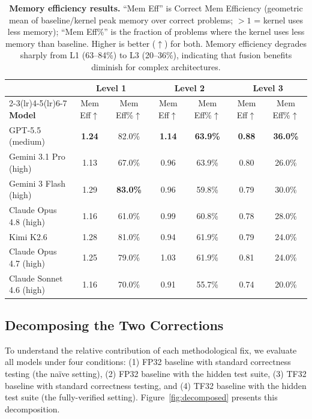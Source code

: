 \documentclass[11pt]{article}
\newcommand{\best}[1]{\textbf{#1}}
\begin{document}
\begin{table}[H]
\centering
\caption{\textbf{Memory efficiency results.} ``Mem Eff'' is Correct Mem Efficiency (geometric mean of baseline/kernel peak memory over correct problems; $>1$ = kernel uses less memory); ``Mem Eff\%'' is the fraction of problems where the kernel uses less memory than baseline. Higher is better ($\uparrow$) for both. Memory efficiency degrades sharply from L1 (63--84\%) to L3 (20--36\%), indicating that fusion benefits diminish for complex architectures.}
\label{tab:memory}\small
\begin{tabular}{l cc cc cc}
\toprule
& \multicolumn{2}{c}{\textbf{Level 1}} & \multicolumn{2}{c}{\textbf{Level 2}} & \multicolumn{2}{c}{\textbf{Level 3}} \\
\cmidrule(lr){2-3}\cmidrule(lr){4-5}\cmidrule(lr){6-7}
\textbf{Model} & Mem Eff$\uparrow$ & Mem Eff\%$\uparrow$ & Mem Eff$\uparrow$ & Mem Eff\%$\uparrow$ & Mem Eff$\uparrow$ & Mem Eff\%$\uparrow$ \\
\midrule
GPT-5.5 (medium)           & \best{1.24} & 82.0\% & \best{1.14} & \best{63.9\%} & \best{0.88} & \best{36.0\%} \\
Gemini 3.1 Pro (high)      & 1.13 & 67.0\% & 0.96 & 63.9\% & 0.80 & 26.0\% \\
Gemini 3 Flash (high)      & 1.29 & \best{83.0\%} & 0.96 & 59.8\% & 0.79 & 30.0\% \\
Claude Opus 4.8 (high)     & 1.16 & 61.0\% & 0.99 & 60.8\% & 0.78 & 28.0\% \\
Kimi K2.6                  & 1.28 & 81.0\% & 0.94 & 61.9\% & 0.79 & 24.0\% \\
Claude Opus 4.7 (high)     & 1.25 & 79.0\% & 1.03 & 61.9\% & 0.81 & 24.0\% \\
Claude Sonnet 4.6 (high)   & 1.16 & 70.0\% & 0.91 & 55.7\% & 0.74 & 20.0\% \\
\bottomrule
\end{tabular}
\end{table}



\subsection{Decomposing the Two Corrections}
\label{sec:decomp}

To understand the relative contribution of each methodological fix, we evaluate all models under four conditions: (1) FP32 baseline with standard correctness testing (the na\"ive setting), (2) FP32 baseline with the hidden test suite, (3) TF32 baseline with standard correctness testing, and (4) TF32 baseline with the hidden test suite (the fully-verified setting). Figure~\ref{fig:decomposed} presents this decomposition.
\end{document}
